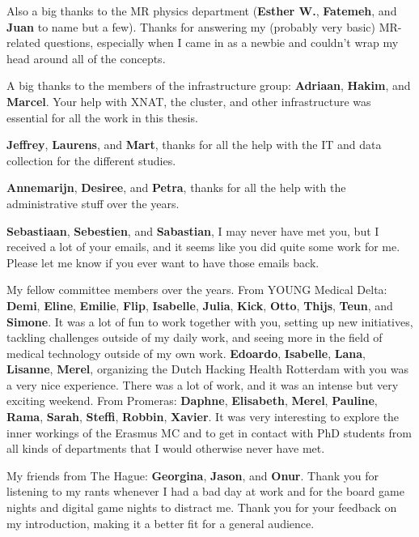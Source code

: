 Also a big thanks to the MR physics department (\textbf{Esther W.}, \textbf{Fatemeh}, and \textbf{Juan} to name but a few).
Thanks for answering my (probably very basic) MR-related questions, especially when I came in as a newbie and couldn't wrap my head around all of the concepts.

A big thanks to the members of the infrastructure group: \textbf{Adriaan}, \textbf{Hakim}, and \textbf{Marcel}.
Your help with XNAT, the cluster, and other infrastructure was essential for all the work in this thesis.

\textbf{Jeffrey}, \textbf{Laurens}, and \textbf{Mart}, thanks for all the help with the IT and data collection for the different studies.

\textbf{Annemarijn}, \textbf{Desiree}, and \textbf{Petra}, thanks for all the help with the administrative stuff over the years.

\textbf{Sebastiaan}, \textbf{Sebestien}, and \textbf{Sabastian}, I may never have met you, but I received a lot of your emails, and it seems like you did quite some work for me.
Please let me know if you ever want to have those emails back.


My fellow committee members over the years.
From YOUNG Medical Delta: \textbf{Demi}, \textbf{Eline}, \textbf{Emilie}, \textbf{Flip}, \textbf{Isabelle}, \textbf{Julia}, \textbf{Kick}, \textbf{Otto}, \textbf{Thijs}, \textbf{Teun}, and \textbf{Simone}.
It was a lot of fun to work together with you, setting up new initiatives, tackling challenges outside of my daily work, and seeing more in the field of medical technology outside of my own work.
\textbf{Edoardo}, \textbf{Isabelle}, \textbf{Lana}, \textbf{Lisanne}, \textbf{Merel}, organizing the Dutch Hacking Health Rotterdam with you was a very nice experience.
There was a lot of work, and it was an intense but very exciting weekend.
From Promeras: \textbf{Daphne}, \textbf{Elisabeth}, \textbf{Merel}, \textbf{Pauline}, \textbf{Rama}, \textbf{Sarah}, \textbf{Steffi}, \textbf{Robbin}, \textbf{Xavier}.
It was very interesting to explore the inner workings of the Erasmus MC and to get in contact with PhD students from all kinds of departments that I would otherwise never have met.


My friends from The Hague: \textbf{Georgina}, \textbf{Jason}, and \textbf{Onur}.
Thank you for listening to my rants whenever I had a bad day at work and for the board game nights and digital game nights to distract me.
Thank you for your feedback on my introduction, making it a better fit for a general audience.

